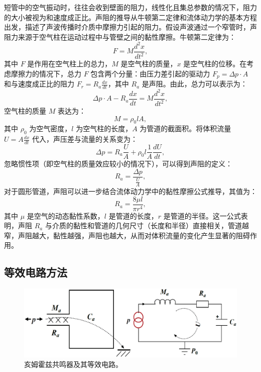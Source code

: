 短管中的空气振动时，往往会收到壁面的阻力，线性化且集总参数的情况下，阻力的大小被视为和速度成正比。声阻的推导从牛顿第二定律和流体动力学的基本方程出发，描述了声波传播时介质中摩擦力引起的阻力。假设声波通过一个窄管时，声阻力来源于空气柱在运动过程中与管壁之间的黏性摩擦。牛顿第二定律为：
\begin{equation} \label{eq2-19}
  F = M \frac{d^2 x}{dt^2},
\end{equation}
其中 \( F \) 是作用在空气柱上的总力，\( M \) 是空气柱的质量，\( x \) 是空气柱的位移。在考虑摩擦力的情况下，总力 \( F \) 包含两个分量：由压力差引起的驱动力 \( F_p = \Delta p \cdot A \) 和与速度成正比的阻力 \( F_r = R_a \frac{dx}{dt} \)，其中 \( R_a \) 是声阻。由此，总力可以表示为：
\begin{equation} \label{eq2-20}
  \Delta p \cdot A - R_a \frac{dx}{dt} = M \frac{d^2 x}{dt^2},
\end{equation}
空气柱的质量 \( M \) 表达为：
\begin{equation} \label{eq2-21}
  M = \rho_0 l A,
\end{equation}
其中 \( \rho_0 \) 为空气密度，\( l \) 为空气柱的长度，\( A \) 为管道的截面积。将体积流量 \( U = A \frac{dx}{dt} \) 代入，声压差与流量的关系变为：
\begin{equation} \label{eq2-22}
  \Delta p = R_a \frac{U}{A} + \rho_0 l \frac{1}{A} \frac{dU}{dt},
\end{equation}
忽略惯性项（即空气柱的质量效应较小的情况下），可以得到声阻的定义：
\begin{equation} \label{eq2-23}
  R_a = \frac{\Delta p}{\frac{U}{A}},
\end{equation}
对于圆形管道，声阻可以进一步结合流体动力学中的黏性摩擦公式推导，其值为：
\begin{equation} \label{eq2-24}
  R_a = \frac{8 \mu l}{\pi r^4},
\end{equation}
其中 \( \mu \) 是空气的动态黏性系数，\( l \) 是管道的长度，\( r \) 是管道的半径。这一公式表明，声阻 \( R_a \) 与介质的黏性和管道的几何尺寸（长度和半径）直接相关，管道越窄，声阻越大，黏性越强，声阻也越大，从而对体积流量的变化产生显著的阻碍作用。

\subsection{等效电路方法}

\begin{figure}[h!]
  \centering
  \includegraphics[width=1\textwidth]{images/fig2-3.eps} 
  \caption{亥姆霍兹共鸣器及其等效电路。}
  \label{fig_2_3}
\end{figure}

